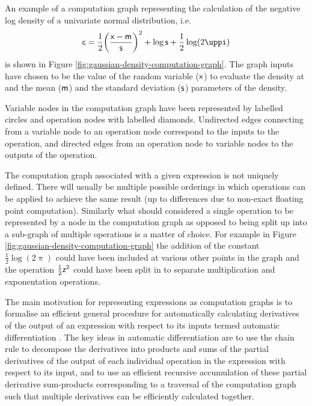 An example of a computation graph representing the calculation of the negative log density of a univariate normal distribution, i.e.
\begin{equation}\label{eq:gaussian-nld-computation-graph-expression}
  \rvar{c} =
  \frac{1}{2}\lpa\frac{\rvar{x} - \rvar{m}}{\rvar{s}}\rpa^2 + \log\rvar{s} + \frac{1}{2}\log(2\uppi)
\end{equation}
is shown in Figure \ref{fig:gaussian-density-computation-graph}. The graph inputs have chosen to be the value of the random variable ($\mathsf{x}$) to evaluate the density at and the mean ($\mathsf{m}$) and the standard deviation ($\mathsf{s}$) parameters of the density. %

Variable nodes in the computation graph have been represented by labelled circles and operation nodes with labelled diamonds. Undirected edges connecting from a variable node to an operation node correspond to the inputs to the operation, and directed edges from an operation node to variable nodes to the outputs of the operation.

The computation graph associated with a given expression is not uniquely defined. There will usually be multiple possible orderings in which operations can be applied to achieve the same result (up to differences due to non-exact floating point computation). Similarly what should considered a single operation to be represented by a node in the computation graph as opposed to being split up into a sub-graph of multiple operations is a matter of choice. For example in Figure \ref{fig:gaussian-density-computation-graph} the addition of the constant $\frac{1}{2}\log(2\uppi)$ could have been included at various other points in the graph and the operation $\frac{1}{2}\mathsf{z}^2$ could have been split in to separate multiplication and exponentation operations.

The main motivation for representing expressions as computation graphs is to formalise an efficient general procedure for automatically calculating derivatives of the output of an expression with respect to its inputs termed automatic differentiation \citep{nolan1953analytical,beda1959programs}. The key ideas in automatic differentiation are to use the chain rule to decompose the derivatives into products and sums of the partial derivatives of the output of each individual operation in the expression with respect to its input, and to use an efficient recursive accumulation of these partial derivative sum-products corresponding to a traversal of the computation graph such that multiple derivatives can be efficiently calculated together.

